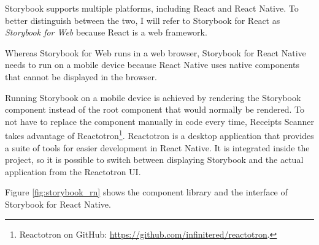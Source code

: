 \documentclass[
  digital, %
  table,   %
  oneside, %
  lof,     %
  lot,     %
]{fithesis3}
\begin{document}
Storybook supports multiple platforms, including React and React Native. To better distinguish between the two, I will refer to Storybook for React as \textit{Storybook for Web} because React is a web framework.

Whereas Storybook for Web runs in a web browser, Storybook for React Native needs to run on a mobile device because React Native uses native components that cannot be displayed in the browser.

\label{phantom:reactotron}
Running Storybook on a mobile device is achieved by rendering the Storybook component instead of the root component that would normally be rendered. To not have to replace the component manually in code every time, Receipts Scanner takes advantage of Reactotron\footnote{Reactotron on GitHub: \url{https://github.com/infinitered/reactotron}.}. Reactotron is a desktop application that provides a suite of tools for easier development in React Native. It is integrated inside the project, so it is possible to switch between displaying Storybook and the actual application from the Reactotron UI. 

Figure \ref{fig:storybook_rn} shows the component library and the interface of Storybook for React Native.
\end{document}
